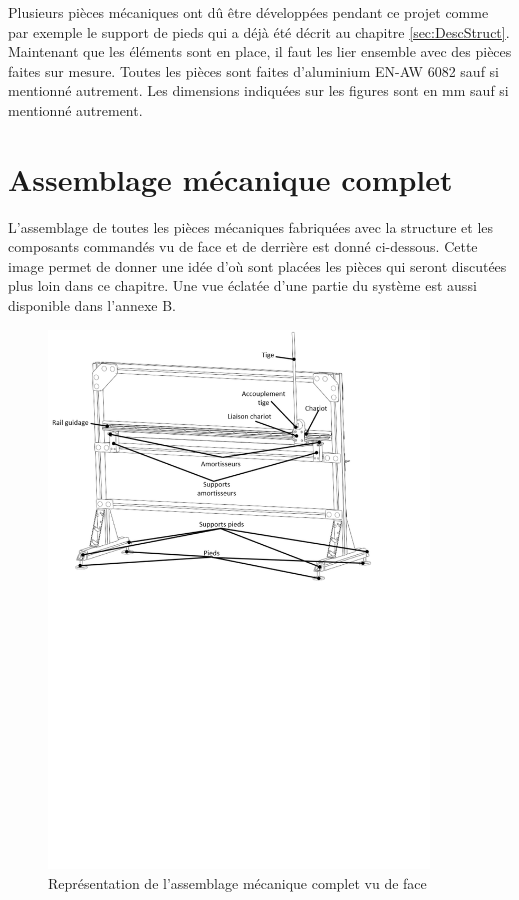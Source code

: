 Plusieurs pièces mécaniques ont dû être développées pendant ce projet comme par exemple le support de pieds  qui a déjà été décrit au chapitre \ref{sec:DescStruct}.
Maintenant que les éléments sont en place, il faut les lier ensemble avec des pièces faites sur mesure. Toutes les pièces sont faites
d'aluminium EN-AW 6082 sauf si mentionné autrement. Les dimensions indiquées sur les figures sont en mm sauf si mentionné autrement.

\section{Assemblage mécanique complet}\label{sec:AssMecComp}
L'assemblage de toutes les pièces mécaniques fabriquées avec la structure et les composants commandés vu de face et de derrière est
donné ci-dessous. Cette image permet de donner une idée d'où sont placées les pièces qui seront discutées plus loin dans ce chapitre. Une vue
éclatée d'une partie du système est aussi disponible dans l'annexe B.

\begin{figure}[H]
    \centering
    \includegraphics[width = 0.9\textwidth]{assets/figures/AssemblageCompletFace.svg}
    \caption{Représentation de l'assemblage mécanique complet vu de face}
    \label{fig:AssCompFace}
\end{figure}

